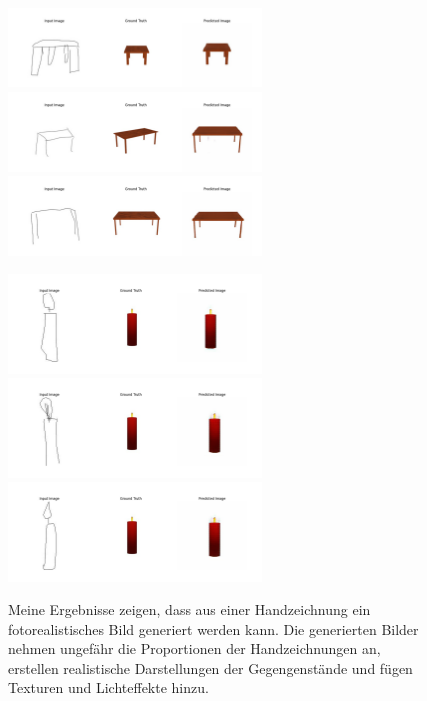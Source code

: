 \begin{figure}[h]
	\centering
	\includegraphics[width=0.6\textwidth]{bilder/table1small.png}
	\includegraphics[width=0.6\textwidth]{bilder/table2small.png}
	\includegraphics[width=0.6\textwidth]{bilder/table3small.png}

	\includegraphics[width=0.6\textwidth]{bilder/candle1small.png}
	\includegraphics[width=0.6\textwidth]{bilder/candle2small.png}
	\includegraphics[width=0.6\textwidth]{bilder/candle3small.png}
	\caption[Eigene Beispiele]{Meine Ergebnisse zeigen, dass aus einer Handzeichnung ein fotorealistisches Bild generiert werden kann. Die generierten Bilder nehmen ungefähr die Proportionen der Handzeichnungen an, erstellen realistische Darstellungen der Gegengenstände und fügen Texturen und Lichteffekte hinzu.}
	\label{fig:myexamples}
\end{figure}

